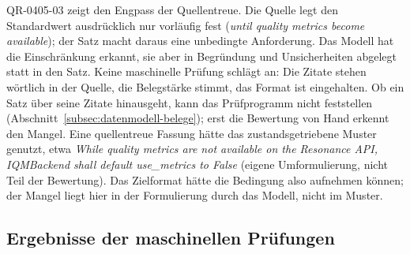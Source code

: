 \documentclass[11pt,a4paper]{report}
\begin{document}
QR-0405-03 zeigt den Engpass der Quellentreue. Die Quelle legt den
Standardwert ausdrücklich nur vorläufig fest (\emph{until quality metrics
become available}); der Satz macht daraus eine unbedingte Anforderung.
Das Modell hat die Einschränkung erkannt, sie aber in Begründung und
Unsicherheiten abgelegt statt in den Satz. Keine maschinelle Prüfung
schlägt an: Die Zitate stehen wörtlich in der Quelle, die Belegstärke
stimmt, das Format ist eingehalten. Ob ein Satz über seine Zitate
hinausgeht, kann das Prüfprogramm nicht feststellen
(Abschnitt~\ref{subsec:datenmodell-belege}); erst die Bewertung von Hand
erkennt den Mangel. Eine quellentreue Fassung hätte das zustandsgetriebene
Muster genutzt, etwa \emph{While quality metrics are not available on the
Resonance API, IQMBackend shall default use\_metrics to False} (eigene
Umformulierung, nicht Teil der Bewertung). Das Zielformat hätte die
Bedingung also aufnehmen können; der Mangel liegt hier in der
Formulierung durch das Modell, nicht im Muster.

\subsection{Ergebnisse der maschinellen Prüfungen}
\label{subsec:bewertung-maschinell}
\end{document}
